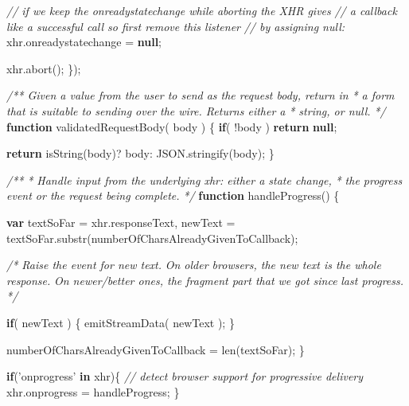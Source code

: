 \documentclass[12pt, ]{article}
\newenvironment{Shaded}{}{}
\newcommand{\KeywordTok}[1]{\textcolor[rgb]{0.00,0.44,0.13}{\textbf{{#1}}}}
\newcommand{\StringTok}[1]{\textcolor[rgb]{0.25,0.44,0.63}{{#1}}}
\newcommand{\CommentTok}[1]{\textcolor[rgb]{0.38,0.63,0.69}{\textit{{#1}}}}
\newcommand{\OtherTok}[1]{\textcolor[rgb]{0.00,0.44,0.13}{{#1}}}
\newcommand{\FunctionTok}[1]{\textcolor[rgb]{0.02,0.16,0.49}{{#1}}}
\newcommand{\NormalTok}[1]{{#1}}
\begin{document}
\begin{Shaded}
\begin{Highlighting}[]
      \CommentTok{// if we keep the onreadystatechange while aborting the XHR gives }
      \CommentTok{// a callback like a successful call so first remove this listener}
      \CommentTok{// by assigning null:}
      \OtherTok{xhr}\NormalTok{.}\FunctionTok{onreadystatechange} \NormalTok{= }\KeywordTok{null}\NormalTok{;}
            
      \OtherTok{xhr}\NormalTok{.}\FunctionTok{abort}\NormalTok{();}
   \NormalTok{\});}

   \CommentTok{/** Given a value from the user to send as the request body, return in}
\CommentTok{    *  a form that is suitable to sending over the wire. Returns either a }
\CommentTok{    *  string, or null.        }
\CommentTok{    */}
   \KeywordTok{function} \FunctionTok{validatedRequestBody}\NormalTok{( body ) \{}
      \KeywordTok{if}\NormalTok{( !body )}
         \KeywordTok{return} \KeywordTok{null}\NormalTok{;}
   
      \KeywordTok{return} \FunctionTok{isString}\NormalTok{(body)? body: }\OtherTok{JSON}\NormalTok{.}\FunctionTok{stringify}\NormalTok{(body);}
   \NormalTok{\}      }

   \CommentTok{/** }
\CommentTok{    * Handle input from the underlying xhr: either a state change,}
\CommentTok{    * the progress event or the request being complete.}
\CommentTok{    */}
   \KeywordTok{function} \FunctionTok{handleProgress}\NormalTok{() \{}
                        
      \KeywordTok{var} \NormalTok{textSoFar = }\OtherTok{xhr}\NormalTok{.}\FunctionTok{responseText}\NormalTok{,}
          \NormalTok{newText = }\OtherTok{textSoFar}\NormalTok{.}\FunctionTok{substr}\NormalTok{(numberOfCharsAlreadyGivenToCallback);}
      
      
      \CommentTok{/* Raise the event for new text.}
\CommentTok{      }
\CommentTok{         On older browsers, the new text is the whole response. }
\CommentTok{         On newer/better ones, the fragment part that we got since }
\CommentTok{         last progress. */}
         
      \KeywordTok{if}\NormalTok{( newText ) \{}
         \FunctionTok{emitStreamData}\NormalTok{( newText );}
      \NormalTok{\} }

      \NormalTok{numberOfCharsAlreadyGivenToCallback = }\FunctionTok{len}\NormalTok{(textSoFar);}
   \NormalTok{\}}
   
   
   \KeywordTok{if}\NormalTok{(}\StringTok{'onprogress'} \KeywordTok{in} \NormalTok{xhr)\{  }\CommentTok{// detect browser support for progressive delivery}
      \OtherTok{xhr}\NormalTok{.}\FunctionTok{onprogress} \NormalTok{= handleProgress;}
   \NormalTok{\}}
   

\end{Highlighting}
\end{Shaded}
\end{document}
